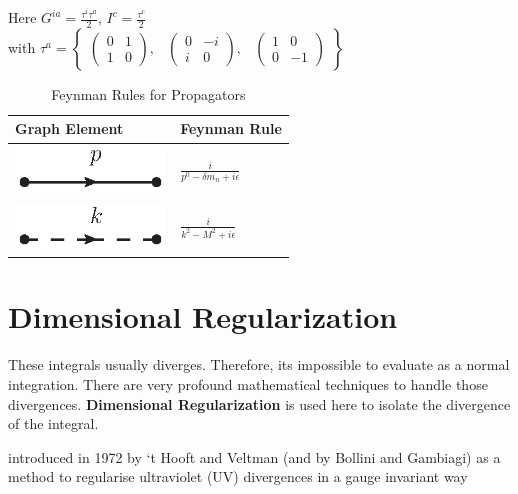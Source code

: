 \documentclass{article}
\begin{document}
Here  $G^{ia}=\frac{\tau^i \tau^a}{2}$, $I^{c}=\frac{\tau^c}{2}$ \\
with $ \tau^a =\begin{Bmatrix} \begin{pmatrix}0&1\\1&0\end{pmatrix}, & \begin{pmatrix}0&-i\\i&0\end{pmatrix}, & \begin{pmatrix}1&0\\0&-1\end{pmatrix} \end{Bmatrix}   $ 

\newpage
\begin{table}
	[ht]
	\centering
	\caption{Feynman Rules for Propagators} 
	\vspace{5mm}
	\begin{tabular}{ M{3.5cm} M{3.5cm}}
		\hline 
		Graph Element & Feynman Rule\\
		\hline 
		\includegraphics[trim={7cm 25cm 7cm 2cm}, clip=true,width=  4cm]{images/Pi_N_FR_fermion.eps} &		
		$\frac{i}{p^0-\delta m_n+i\epsilon}$\\ 
		\includegraphics[trim={7cm 25cm 7cm 2cm}, clip=true,width= 	4cm]{images/Pi_N_FR_meson.eps} &
		$ \frac{i}{k^2-M^2+i\epsilon}$  \\ 
		\hline
	\end{tabular}
\end{table}


\newpage
\section{Dimensional Regularization}


These integrals usually diverges. Therefore, its impossible to evaluate as a normal integration. There are very profound mathematical techniques to handle those divergences. \textbf{Dimensional Regularization} is used here to isolate the divergence of the integral.

introduced in 1972 by ‘t Hooft and Veltman (and by Bollini
and Gambiagi) as a method to regularise ultraviolet (UV) divergences in a gauge invariant way
\end{document}
